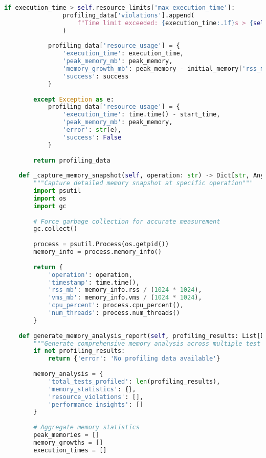 \begin{lstlisting}[language=Python, caption=Memory Profiling and Resource Monitoring for Testing]
            if execution_time > self.resource_limits['max_execution_time']:
                profiling_data['violations'].append(
                    f"Time limit exceeded: {execution_time:.1f}s > {self.resource_limits['max_execution_time']}s"
                )
            
            profiling_data['resource_usage'] = {
                'execution_time': execution_time,
                'peak_memory_mb': peak_memory,
                'memory_growth_mb': peak_memory - initial_memory['rss_mb'],
                'success': success
            }
            
        except Exception as e:
            profiling_data['resource_usage'] = {
                'execution_time': time.time() - start_time,
                'peak_memory_mb': peak_memory,
                'error': str(e),
                'success': False
            }
        
        return profiling_data
    
    def _capture_memory_snapshot(self, operation: str) -> Dict[str, Any]:
        """Capture detailed memory snapshot at specific operation"""
        import psutil
        import os
        import gc
        
        # Force garbage collection for accurate measurement
        gc.collect()
        
        process = psutil.Process(os.getpid())
        memory_info = process.memory_info()
        
        return {
            'operation': operation,
            'timestamp': time.time(),
            'rss_mb': memory_info.rss / (1024 * 1024),
            'vms_mb': memory_info.vms / (1024 * 1024),
            'cpu_percent': process.cpu_percent(),
            'num_threads': process.num_threads()
        }
    
    def generate_memory_analysis_report(self, profiling_results: List[Dict]) -> Dict[str, Any]:
        """Generate comprehensive memory analysis across multiple test executions"""
        if not profiling_results:
            return {'error': 'No profiling data available'}
        
        memory_analysis = {
            'total_tests_profiled': len(profiling_results),
            'memory_statistics': {},
            'resource_violations': [],
            'performance_insights': []
        }
        
        # Aggregate memory statistics
        peak_memories = []
        memory_growths = []
        execution_times = []
        

\end{lstlisting}

